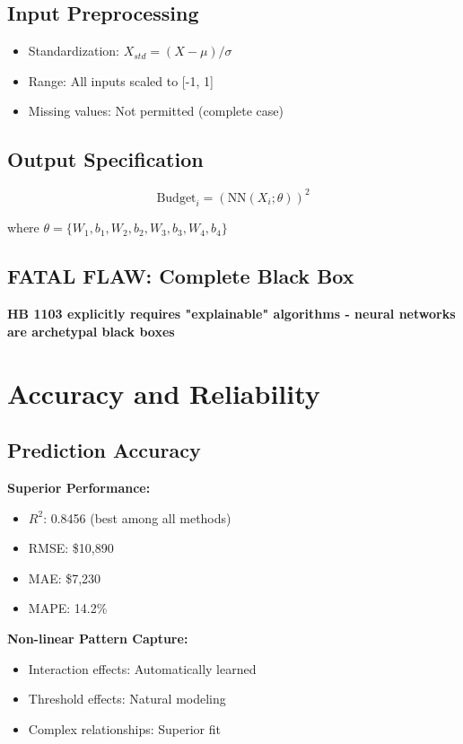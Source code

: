 \subsection{Input Preprocessing}

\begin{itemize}
    \item Standardization: $X_{std} = (X - \mu) / \sigma$
    \item Range: All inputs scaled to [-1, 1]
    \item Missing values: Not permitted (complete case)
\end{itemize}

\subsection{Output Specification}

\begin{equation}
\text{Budget}_i = \left(\text{NN}(X_i; \theta)\right)^2
\end{equation}

where $\theta = \{W_1, b_1, W_2, b_2, W_3, b_3, W_4, b_4\}$

\subsection{FATAL FLAW: Complete Black Box}

\yellowwarning \textbf{HB 1103 explicitly requires "explainable" algorithms - neural networks are archetypal black boxes}

\section{Accuracy and Reliability}

\subsection{Prediction Accuracy}

\textbf{Superior Performance:}
\begin{itemize}
    \item $R^2$: 0.8456 (best among all methods)
    \item RMSE: \$10,890
    \item MAE: \$7,230
    \item MAPE: 14.2\%
\end{itemize}

\textbf{Non-linear Pattern Capture:}
\begin{itemize}
    \item Interaction effects: Automatically learned
    \item Threshold effects: Natural modeling
    \item Complex relationships: Superior fit
\end{itemize}

